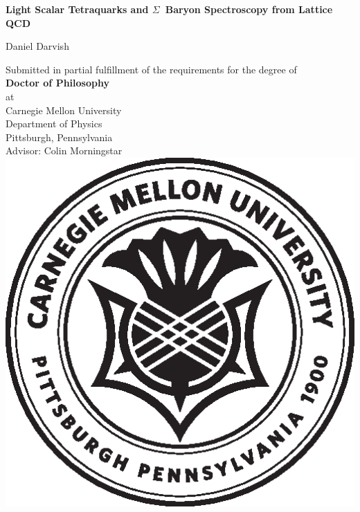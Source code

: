 \begin{titlepage}
    \begin{center}
        \vspace*{1cm}
 
        {\huge \textbf{Light Scalar Tetraquarks and \mbox{$\Sigma$ Baryon} Spectroscopy from Lattice QCD}}
    
        \vfill
 
        {\Large Daniel Darvish}
        \large
        \vfill
             
        Submitted in partial fulfillment of the requirements for the degree of\\
        \textbf{Doctor of Philosophy}\\
        at\\
        Carnegie Mellon University\\
        Department of Physics\\
        Pittsburgh, Pennsylvania\\
        \vspace{1cm}
        Advisor: Colin Morningstar
        \vfill
        \includegraphics[scale=0.6]{figures/cmu.eps}
             
    \end{center}
 \end{titlepage}